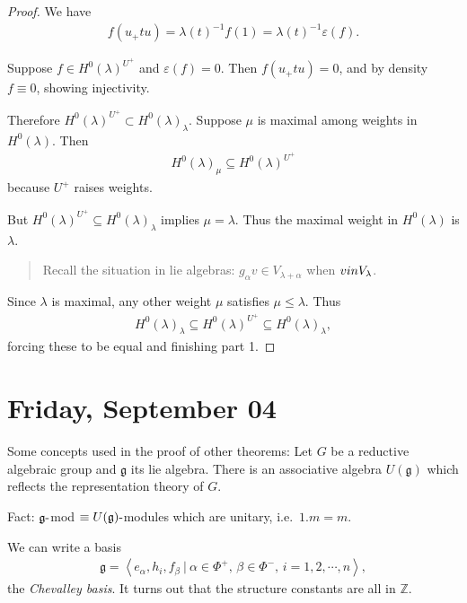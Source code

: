 \begin{proof}

We have
\begin{align*}  
f(u_+ t u) = \lambda(t)^{-1} f(1) = \lambda(t)^{-1} \varepsilon(f)
.\end{align*}

Suppose \(f\in H^0(\lambda)^{U^+}\) and \(\varepsilon(f) = 0\). Then
\(f(u_+ t u) = 0\), and by density \(f\equiv 0\), showing injectivity.

Therefore \(H^0(\lambda)^{U^+}\subset H^0(\lambda)_\lambda\). Suppose
\(\mu\) is maximal among weights in \(H^0(\lambda)\). Then
\begin{align*}  
H^0(\lambda)_{\mu} \subseteq H^0(\lambda)^{U^+}
\end{align*}
because \(U^+\) raises weights.

But \(H^0(\lambda)^{U^+} \subseteq H^0(\lambda)_\lambda\) implies
\(\mu = \lambda\). Thus the maximal weight in \(H^0(\lambda)\) is
\(\lambda\).

\begin{quote}
Recall the situation in lie algebras:
\(g_\alpha v \in V_{\lambda + \alpha}\) when \(v\\in V_{\lambda}\).
\end{quote}

Since \(\lambda\) is maximal, any other weight \(\mu\) satisfies
\(\mu \leq \lambda\). Thus
\begin{align*}  
H^0(\lambda)_\lambda \subseteq H^0(\lambda)^{U^+} \subseteq H^0(\lambda)_\lambda
,\end{align*}
forcing these to be equal and finishing part 1.

\end{proof}

\hypertarget{friday-september-04}{%
\section{Friday, September 04}\label{friday-september-04}}

Some concepts used in the proof of other theorems: Let \(G\) be a
reductive algebraic group and \({\mathfrak{g}}\) its lie algebra. There
is an associative algebra \(U({\mathfrak{g}})\) which reflects the
representation theory of \(G\).

Fact: \({\mathfrak{g}}{\hbox{-}}\)mod
\(\equiv U({\mathfrak{g}}){\hbox{-}}\)modules which are unitary,
i.e.~\(1.m = m\).

We can write a basis
\begin{align*}  
{\mathfrak{g}}= \left\langle{e_\alpha, h_i, f_\beta {~\mathrel{\Big|}~}\alpha\in\Phi^+,\, \beta\in\Phi^-,\, i = 1,2,\cdots,n}\right\rangle
,\end{align*}
the \emph{Chevalley basis}. It turns out that the structure constants
are all in \({\mathbb{Z}}\).

